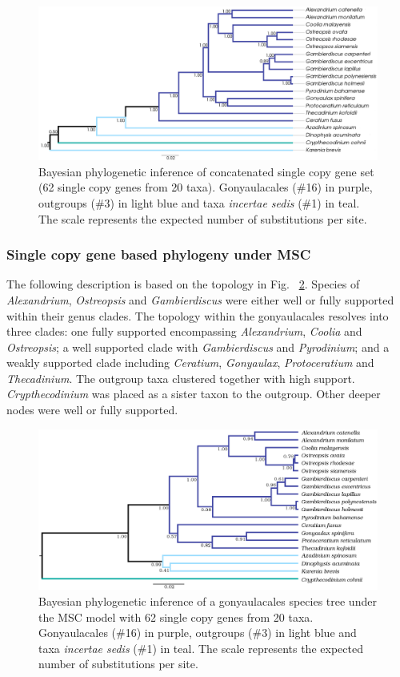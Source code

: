 \documentclass[fleqn,10pt,lineno]{wlpeerj} %
\begin{document}
\begin{figure}[ht] 
\centering
\includegraphics[width=\linewidth]{gonya-figs/SC-concat-BI.png} 
\caption{Bayesian phylogenetic inference of concatenated single copy gene set (62 single copy genes from 20 taxa). Gonyaulacales (\#16) in purple, outgroups (\#3) in light blue and taxa \textit{incertae sedis} (\#1) in teal. The scale represents the expected number of substitutions per site.} 
\label{fig:SCconcatBI}
\end{figure} 

\subsubsection*{Single copy gene based phylogeny under MSC}
The following description is based on the topology in Fig. ~\ref{fig:SCmscBI}. 
Species of \emph{Alexandrium}, \emph{Ostreopsis} and \emph{Gambierdiscus} were either well or fully supported within their genus clades. 
The topology within the gonyaulacales resolves into three clades: 
one fully supported encompassing \emph{Alexandrium}, \emph{Coolia} and \emph{Ostreopsis};
a well supported clade with \emph{Gambierdiscus} and \emph{Pyrodinium}; 
and a weakly supported clade including \emph{Ceratium}, \emph{Gonyaulax}, \emph{Protoceratium} and \emph{Thecadinium}. 
The outgroup taxa clustered together with high support. 
\emph{Crypthecodinium} was placed as a sister taxon to the outgroup. 
Other deeper nodes were well or fully supported.

\begin{figure}[ht]
\centering
\includegraphics[width=\linewidth]{gonya-figs/Aug2-20-taxa-combined-fig-MCC-trees.png} 
\caption{Bayesian phylogenetic inference of a gonyaulacales species tree under the MSC model with 62 single copy genes from 20 taxa. Gonyaulacales (\#16) in purple, outgroups (\#3) in light blue and taxa \textit{incertae sedis} (\#1) in teal. The scale represents the expected number of substitutions per site.} 
\label{fig:SCmscBI}
\end{figure} 
\end{document}
